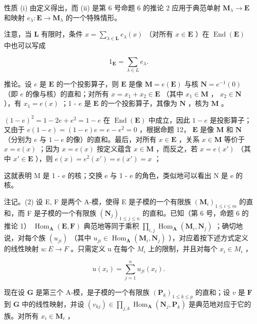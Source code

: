 性质 (i) 由定义得出，而 (ii) 是第 6 号命题 6 的推论 2 应用于典范单射 \(\mathbf{M}_{\lambda} \to \mathbf{E}\) 和映射 \(e_{\lambda}: \mathbf{E} \to \mathbf{M}_{\lambda}\) 的一个特殊情形。

注意，当 \(\mathbf{L}\) 有限时，条件 \(x = \sum_{\lambda \in \mathbf{L}} e_{\lambda}(x)\) （对所有 \(x \in \mathbf{E}\) ）在 \(\operatorname{End}(\mathbf{E})\) 中也可以写成

\[
1 _ {\mathbf {E}} = \sum_ {\lambda \in L} e _ {\lambda}.\tag{31}
\]

推论。设 \(e\) 是 \(\mathbf{E}\) 的一个投影算子，则 \(\mathbf{E}\) 是像 \(\mathbf{M} = e(\mathbf{E})\) 与核 \(\mathbf{N} = e^{-1}(0)\) （即 \(e\) 的像与核）的直和；对所有 \(x = x_1 + x_2 \in \mathbf{E}\) （其中 \(x_1 \in \mathbf{M}\) ， \(x_2 \in \mathbf{N}\) ），有 \(x_1 = e(x)\) ；1 - \(e\) 是 \(\mathbf{E}\) 的一个投影算子，其像为 \(\mathbf{N}\) ，核为 \(\mathbf{M}\) 。

\((1 - e)^2 = 1 - 2e + e^2 = 1 - e\) 在 \(\operatorname{End}(\mathbf{E})\) 中成立，因此 \(1 - e\) 是投影算子；又由于 \(e(1 - e) = (1 - e)e = e - e^2 = 0\) ，根据命题 12， \(\mathbf{E}\) 是像 \(\mathbf{M}\) 和 \(\mathbf{N}\) （分别为 \(e\) 与 \(1 - e\) 的像）的直和。最后，对所有 \(x \in \mathbf{E}\) ，关系 \(x \in \mathbf{M}\) 等价于 \(x = e(x)\) ；因为 \(x = e(x)\) 按定义蕴含 \(x \in \mathbf{M}\) ，而反之，若 \(x = e(x')\) （其中 \(x' \in \mathbf{E}\) ），则 \(e(x) = e^2(x') = e(x') = x\) ；

这就表明 M 是 1 - e 的核；交换 e 与 1 - e 的角色，类似地可以看出 N 是 e 的核。

注记。(2) 设 E, F 是两个 A-模，使得 E 是子模的一个有限族 \((\mathbf{M}_{i})_{1\leqslant i\leqslant m}\) 的直和，而 F 是子模的一个有限族 \((\mathbf{N}_{j})_{1\leqslant j\leqslant n}\) 的直和。已知（第 6 号，命题 6 的推论 1） \(\operatorname{Hom}_{\mathbf{A}}(\mathbf{E},\mathbf{F})\) 典范地等同于乘积 \(\prod_{i,j}\operatorname{Hom}_{\mathbf{A}}(\mathbf{M}_{i},\mathbf{N}_{j})\) ；确切地说，对每个族 \((u_{ji})\) （其中 \(u_{ji}\in\operatorname{Hom}_{\mathbf{A}}(\mathbf{M}_{i},\mathbf{N}_{j})\) ），对应着按下述方式定义的线性映射 \(u:E\to F\) 。只需定义 u 在每个 \(M_{i}\) 上的限制，并且对每个 \(x_{i}\in M_{i}\) ，

\[
u (x _ {i}) = \sum_ {j = 1} ^ {n} u _ {j i} (x _ {i}).
\]

现在设 \(\mathbf{G}\) 是第三个 A-模，是子模的一个有限族 \((\mathbf{P}_k)_{1 \leqslant k \leqslant p}\) 的直和；设 \(v\) 是 \(\mathbf{F}\) 到 \(\mathbf{G}\) 中的线性映射，并设 \((v_{kj}) \in \prod_{j,k} \operatorname{Hom}_{\mathbf{A}}(\mathbf{N}_j, \mathbf{P}_k)\) 是典范地对应于它的族。对所有 \(x_i \in \mathbf{M}_i\) ，

